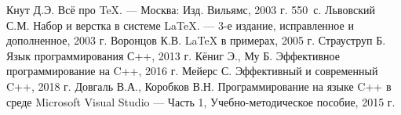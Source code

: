 \documentclass[12pt,a4paper]{scrartcl}
\begin{document}
\begin{thebibliography}{9}
Кнут Д.Э. Всё про \TeX. \newblock --- Москва: Изд. Вильямс, 2003 г. 550~с.
Львовский С.М. Набор и верстка в системе \LaTeX{}. \newblock --- 3-е издание, исправленное и дополненное, 2003 г.
Воронцов К.В. \LaTeX{} в примерах, 2005 г.
 Страуструп Б. Язык программирования С++, 2013 г.
 Кёниг Э., Му Б. Эффективное программирование на C++, 2016 г.
 Мейерс С. Эффективный и современный C++, 2018 г.
 Довгаль В.А., Коробков В.Н. Программирование на языке C++ в среде Microsoft Visual Studio --- Часть 1, Учебно-методическое пособие, 2015 г.
\end{thebibliography}
\end{document}

